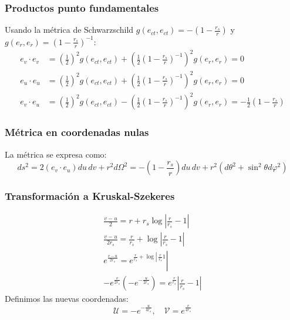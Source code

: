 \subsubsection{Productos punto fundamentales}
Usando la métrica de Schwarzschild \( g(e_{ct},e_{ct}) = -\left(1-\frac{r_s}{r}\right) \) y \( g(e_r,e_r) = \left(1-\frac{r_s}{r}\right)^{-1} \):
\begin{equation}
    \begin{aligned}
        e_v \cdot e_v & = \left(\frac{1}{2}\right)^2 g(e_{ct},e_{ct}) + \left(\frac{1}{2}\left(1-\frac{r_s}{r}\right)^{-1}\right)^2 g(e_r,e_r) = 0                                        \\
        e_u \cdot e_u & = \left(\frac{1}{2}\right)^2 g(e_{ct},e_{ct}) + \left(\frac{1}{2}\left(1-\frac{r_s}{r}\right)^{-1}\right)^2 g(e_r,e_r) = 0                                        \\
        e_v \cdot e_u & = \left(\frac{1}{2}\right)^2 g(e_{ct},e_{ct}) - \left(\frac{1}{2}\left(1-\frac{r_s}{r}\right)^{-1}\right)^2 g(e_r,e_r) = -\frac{1}{2}\left(1-\frac{r_s}{r}\right)
    \end{aligned}
\end{equation}

\subsubsection{Métrica en coordenadas nulas}
La métrica se expresa como:
\begin{equation}
    ds^2 = 2(e_v \cdot e_u) du\, dv + r^2 d\Omega^2 = -\left(1-\frac{r_s}{r}\right) du\, dv + r^2(d\theta^2 + \sin^2\theta d\varphi^2)
\end{equation}

\subsubsection{Transformación a Kruskal-Szekeres}

\begin{equation}
    \begin{array}{l}
        \frac{v-u}{2}=r+r_s \log \left|\frac{r}{r_s}-1\right|                                                  \\
        \frac{v-u}{2 r_s}=\frac{r}{r_s}+\log \left|\frac{r}{r_s}-1\right|                                      \\
        \left.e^{\frac{v-u}{2 r_s}}=e^{\left.\frac{r}{r_s}+\log \right\rvert\, \frac{r}{r_s} 1} \right\rvert\, \\
        -e^{\frac{v}{2 r_s}}\left(-e^{-\frac{u}{2 r_s}}\right)=e^{\frac{r}{r_s}}\left|\frac{r}{r_s}-1\right|
    \end{array}
\end{equation}
Definimos las nuevas coordenadas:
\begin{equation}
    \mathcal{U} = -e^{-\frac{u}{4r_s}}, \quad \mathcal{V} = e^{\frac{v}{4r_s}}
\end{equation}

